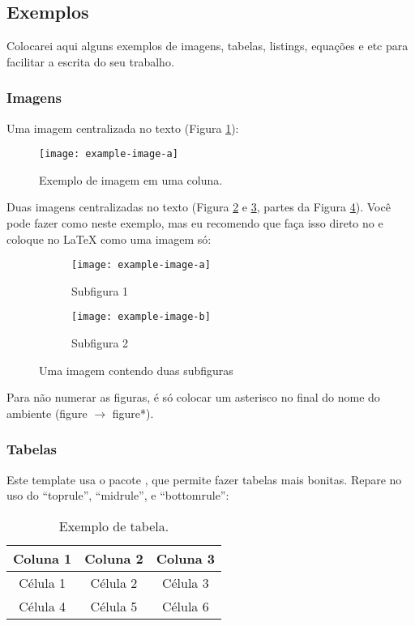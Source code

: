     \subsection{Exemplos}
      Colocarei aqui alguns exemplos de imagens, tabelas, listings, equações e etc para facilitar a escrita do seu trabalho.

      \subsubsection{Imagens}
      Uma imagem centralizada no texto (Figura \ref{fig:ex_1col}):
      \begin{figure}[h]
        \centering
        \texttt{[image: example-image-a]}
        \caption{Exemplo de imagem em uma coluna.}
        \label{fig:ex_1col}
      \end{figure}

      Duas imagens centralizadas no texto (Figura \ref{fig:sub_1} e \ref{fig:sub_2}, partes da Figura \ref{fig:ex_2cols}). Você pode fazer como neste exemplo, mas eu recomendo que faça isso direto no  e coloque no \LaTeX{} como uma imagem só:
      \begin{figure}[h]
        \centering
        \begin{subfigure}{.45\textwidth}
          \centering
          \texttt{[image: example-image-a]}
          \caption{Subfigura 1}
          \label{fig:sub_1}
        \end{subfigure}%
        \begin{subfigure}{.45\textwidth}
          \centering
          \texttt{[image: example-image-b]}
          \caption{Subfigura 2}
          \label{fig:sub_2}
        \end{subfigure}
        \caption{Uma imagem contendo duas subfiguras}
        \label{fig:ex_2cols}
      \end{figure}

      Para não numerar as figuras, é só colocar um asterisco no final do nome do ambiente (figure $\rightarrow$ figure*).
      
      \subsubsection{Tabelas}
        Este template usa o pacote , que permite fazer tabelas mais bonitas. Repare no uso do ``toprule'', ``midrule'', e ``bottomrule'':
        \begin{table}[h!]
          \centering
          \caption{Exemplo de tabela.}
          \label{tab:ex_1}
          \begin{tabular}{ccc}
            \toprule
            \textbf{Coluna 1} & \textbf{Coluna 2} & \textbf{Coluna 3} \\ \midrule
            Célula 1          & Célula 2          & Célula 3          \\ 
            Célula 4          & Célula 5          & Célula 6          \\ 
            \bottomrule
          \end{tabular}
        \end{table}

